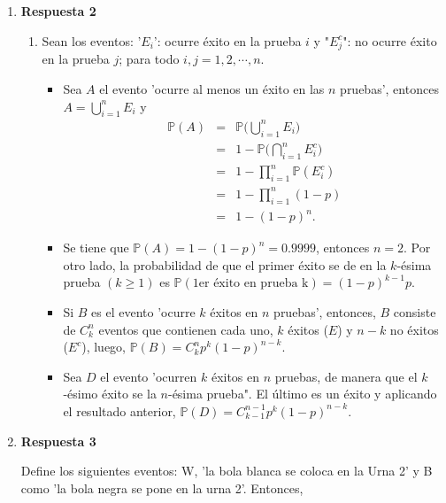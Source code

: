 \documentclass[a4paper,9pt]{report}
\begin{document}
\begin{enumerate}
\begin{enumerate}
Desde que $\mathbb{P}(C)=\mathbb{P}(C|H)\mathbb{P}(H)+\mathbb{P}(C|I)\mathbb{P}(I)+ \mathbb{P}(C|L)\mathbb{P}(L)+\mathbb{P}(C|U)\mathbb{P}(U) =(0.002)(0.05)+(0.001)(0.15)+(0.0001)(0.20)+(0.00001)(0.60)=0.000276.$ Luego se sigue que $\mathbb{P}(B|C) = 0.000250/0.000276=0.906$.
\end{enumerate}
\item [] \textbf{Respuesta 2}
\begin{enumerate}
\item Sean los eventos: '$E_i$': ocurre \'exito en la prueba $i$  y  "$E^c_j$": no ocurre \'exito en la prueba $j$; para todo  $i,j=1,2,\cdots, n$. 
\begin{itemize}
	\item Sea $A$ el evento 'ocurre al menos un \'exito en las $n$ pruebas', entonces $\displaystyle A=\bigcup_{i=1}^n E_i$ y
	\begin{eqnarray*}
		\mathbb{P}(A)&=&\mathbb{P}\bigg(\bigcup_{i=1}^n E_i\bigg)\\
		&=& 1-\mathbb{P}\bigg(\bigcap_{i=1}^n E^c_i\bigg)\\
		&=& 1-\prod_{i=1}^{n}\mathbb{P}(E_i^c)\\
		&=& 1-\prod_{i=1}^{n}(1-p)\\
		&=& 1-(1-p)^n.
	\end{eqnarray*} 
	\item Se tiene que $\mathbb{P}(A)=1-(1-p)^n=0.9999$, entonces $n=2$. Por otro lado, la probabilidad de que el primer \'exito se de en la $k$-\'esima prueba $(k\geq 1)$ es $\mathbb{P}(\text{1er \'exito en prueba k})=(1-p)^{k-1}p$.
	\item Si $B$ es el evento 'ocurre $k$ \'exitos en $n$ pruebas', entonces, $B$ consiste de $C_k^n$ eventos que contienen cada uno, $k$ \'exitos ($E$) y $n-k$ no \'exitos ($E^c$), luego, $\mathbb{P}(B)=C_k^np^k(1-p)^{n-k}$. 
	\item Sea $D$ el evento 'ocurren $k$ \'exitos  en $n$ pruebas, de manera que el $k$-\'esimo  \'exito se la $n$-\'esima prueba". El \'ultimo es un \'exito y aplicando el resultado anterior, $\mathbb{P}(D)=C_{k-1}^{n-1}p^k(1-p)^{n-k}$.
\end{itemize}
\end{enumerate}
\item [] \textbf{Respuesta 3}

Define los siguientes eventos: W, 'la bola blanca se coloca en la Urna 2' y  B  como 'la bola negra se pone en la urna 2'. Entonces,


\end{enumerate}
\end{document}
